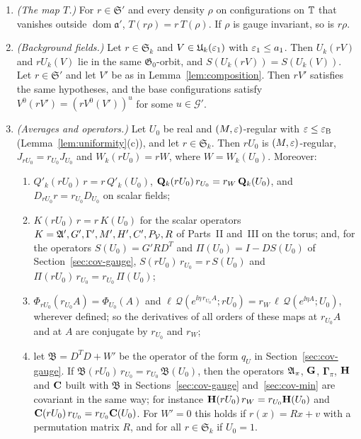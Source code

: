 \begin{proposition}\label{prop:symmetry}
\begin{enumerate}[label=(\alph*)]
\item \emph{(The map $T$.)} For $r\in\mathfrak S'$ and every density $\rho$ on configurations on $\mathbb T$ that vanishes outside $\operatorname{dom}\mathfrak a'$, $T(r\rho)=r\,T(\rho)$. If $\rho$ is gauge invariant, so is $r\rho$.
\item \emph{(Background fields.)} Let $r\in\mathfrak S_k$ and $V\in\mathfrak U_k(\varepsilon_1)$ with $\varepsilon_1\le a_1$. Then $U_k(rV)$ and $rU_k(V)$ lie in the same $\mathfrak G_0$-orbit, and $S(U_k(rV))=S(U_k(V))$. Let $r\in\mathfrak S'$ and let $V'$ be as in Lemma~\ref{lem:composition}. Then $rV'$ satisfies the same hypotheses, and the base configurations satisfy $V^0(rV')=(rV^0(V'))^u$ for some $u\in\mathcal G'$.
\item \emph{(Averages and operators.)} Let $U_0$ be real and $(M,\varepsilon)$-regular with $\varepsilon\le\varepsilon_{\rm B}$ (Lemma~\ref{lem:uniformity}(c)), and let $r\in\mathfrak S_k$. Then $rU_0$ is $(M,\varepsilon)$-regular, $J_{rU_0}=r_{U_0}J_{U_0}$ and $W_k(rU_0)=rW$, where $W=W_k(U_0)$. Moreover:
  \begin{enumerate}[label=(\roman*)]
  \item $Q'_k(rU_0)\,r=r\,Q'_k(U_0)$, $\mathbf Q_k(rU_0)\,r_{U_0}=r_W\,\mathbf Q_k(U_0)$, and $D_{rU_0}r=r_{U_0}D_{U_0}$ on scalar fields;
  \item $K(rU_0)\,r=r\,K(U_0)$ for the scalar operators $K=\mathfrak A',G',\Gamma',M',H',C',P_\mathcal V,R$ of Parts~II and~III on the torus; and, for the operators $S(U_0)=G'RD^T$ and $\Pi(U_0)=I-DS(U_0)$ of Section~\ref{sec:cov-gauge}, $S(rU_0)\,r_{U_0}=r\,S(U_0)$ and $\Pi(rU_0)\,r_{U_0}=r_{U_0}\,\Pi(U_0)$;
  \item $\Phi_{rU_0}(r_{U_0}A)=\Phi_{U_0}(A)$ and $\ell\,\mathcal Q(e^{\ii\eta\,r_{U_0}A};rU_0)=r_W\,\ell\,\mathcal Q(e^{\ii\eta A};U_0)$, wherever defined; so the derivatives of all orders of these maps at $r_{U_0}A$ and at $A$ are conjugate by $r_{U_0}$ and $r_W$;
  \item let $\mathfrak B=D^TD+W'$ be the operator of the form $q_U$ in Section~\ref{sec:cov-gauge}. If $\mathfrak B(rU_0)\,r_{U_0}=r_{U_0}\,\mathfrak B(U_0)$, then the operators $\mathfrak A_\pi$, $\mathbf G$, $\boldsymbol\Gamma_\pi$, $\mathbf H$ and $\mathbf C$ built with $\mathfrak B$ in Sections~\ref{sec:cov-gauge} and~\ref{sec:cov-min} are covariant in the same way; for instance $\mathbf H(rU_0)\,r_W=r_{U_0}\mathbf H(U_0)$ and $\mathbf C(rU_0)\,r_{U_0}=r_{U_0}\mathbf C(U_0)$. For $W'=0$ this holds if $r(x)=Rx+v$ with a permutation matrix $R$, and for all $r\in\mathfrak S_k$ if $U_0=1$.

\end{enumerate}
\end{enumerate}
\end{proposition}
